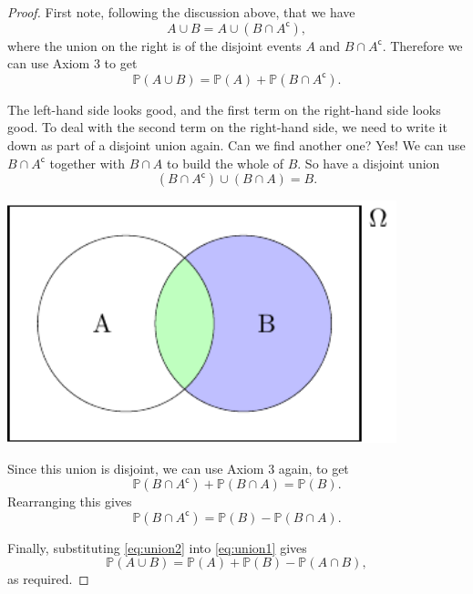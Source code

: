 \documentclass[
  a4paper,
]{book}
\theoremstyle{definition}
\theoremstyle{definition}
\theoremstyle{definition}
\theoremstyle{definition}
\theoremstyle{remark}
\begin{document}
\begin{proof}
First note, following the discussion above, that we have
\[ A \cup B = A \cup (B \cap A^\mathsf{c}) , \]
where the union on the right is of the disjoint events \(A\) and \(B \cap A^\mathsf{c}\). Therefore we can use Axiom 3 to get
\begin{equation}
\mathbb P(A \cup B) = \mathbb P(A) + \mathbb P(B \cap A^\mathsf{c}) .    \label{eq:union1}
\end{equation}

The left-hand side looks good, and the first term on the right-hand side looks good. To deal with the second term on the right-hand side, we need to write it down as part of a disjoint union again. Can we find another one? Yes! We can use \(B \cap A^\mathsf{c}\) together with \(B \cap A\) to build the whole of \(B\). So have a disjoint union
\[ (B \cap A^\mathsf{c}) \cup (B \cap A) = B .\]

\begin{center}\includegraphics[width=320pt]{math1710_files/figure-latex/add2-1} \end{center}

Since this union is disjoint, we can use Axiom 3 again, to get
\[ \mathbb P(B \cap A^\mathsf{c}) + \mathbb P(B \cap A) = \mathbb P(B) . \]
Rearranging this gives
\begin{equation}
\mathbb P(B \cap A^\mathsf{c}) = \mathbb P(B) - \mathbb P(B \cap A).  \label{eq:union2}
\end{equation}

Finally, substituting \eqref{eq:union2} into \eqref{eq:union1} gives
\[ \mathbb P(A \cup B) = \mathbb P(A) + \mathbb P(B) - \mathbb P(A \cap B) , \]
as required.
\end{proof}
\end{document}

